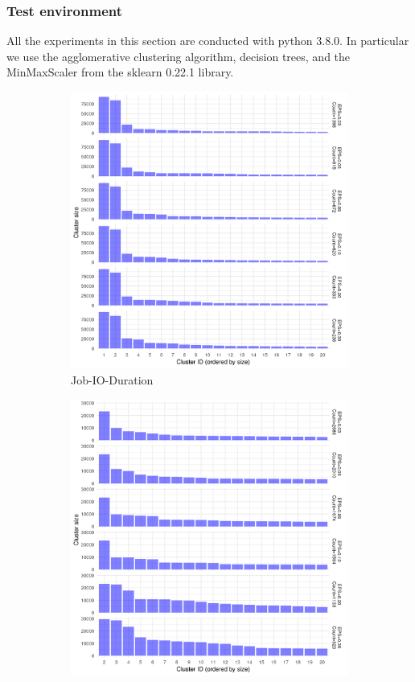 \documentclass[]{llncs}
\begin{document}
\subsubsection{Test environment}
All the experiments in this section are conducted with python 3.8.0.
In particular we use the agglomerative clustering algorithm, decision trees, and the MinMaxScaler from the sklearn 0.22.1 library.

\begin{figure}
	\begin{subfigure}[t]{0.45\textwidth}
	\includegraphics[width=\textwidth]{./media/image10.png}
	\caption{Job-IO-Duration}
	\label{fig:datasets_clustering_results:io_duration}
 \end{subfigure}
 \hfill
 \begin{subfigure}[t]{0.45\textwidth}
	\includegraphics[width=\textwidth]{./media/image12.png}

\end{subfigure}
\end{figure}
\end{document}
